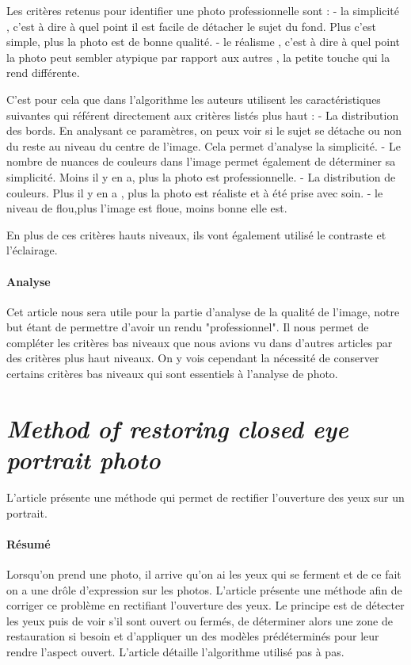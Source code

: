 \documentclass[11pt, french]{report-rd-info}
\begin{document}
Les critères retenus pour identifier une photo professionnelle sont :
- la simplicité , c'est à dire à quel point il est facile de détacher le sujet du fond. Plus c'est simple, plus la photo est de bonne qualité.
- le réalisme , c'est à dire à quel point la photo peut sembler atypique par rapport aux autres , la petite touche qui la rend différente.

C'est pour cela que dans l'algorithme les auteurs utilisent les caractéristiques suivantes qui référent directement aux critères listés plus haut : 
- La distribution des bords. En analysant ce paramètres, on peux voir si le sujet se détache ou non du reste au niveau du centre de l'image. Cela permet d'analyse la simplicité.
- Le nombre de nuances de couleurs dans l'image permet également de déterminer sa simplicité. Moins il y en a, plus la photo est professionnelle.
- La distribution de couleurs. Plus il y en a , plus la photo est réaliste et à été prise avec soin.
- le niveau de flou,plus l'image est floue, moins bonne elle est.

En plus de ces critères hauts niveaux, ils vont également utilisé le contraste et l'éclairage.


\paragraph{Analyse}
Cet article nous sera utile pour la partie d'analyse de la qualité de l'image, notre but étant de permettre d'avoir un rendu "professionnel". Il nous permet de compléter les critères bas niveaux que nous avions vu dans d'autres articles par des critères plus haut niveaux. On y vois cependant la nécessité de conserver certains critères bas niveaux qui sont essentiels à l'analyse de photo.

\section{\emph{Method of restoring closed eye portrait photo}}
L'article \cite{Li} présente une méthode qui permet de rectifier l'ouverture des yeux sur un portrait.

\paragraph{Résumé}
Lorsqu'on prend une photo, il arrive qu'on ai les yeux qui se ferment et de ce fait on a une drôle d'expression sur les photos. L'article présente une méthode afin de corriger ce problème en rectifiant l'ouverture des yeux.
Le principe est de détecter les yeux puis de voir s'il sont ouvert ou fermés, de déterminer alors une zone de restauration si besoin et d'appliquer un des modèles prédéterminés pour leur rendre l'aspect ouvert.
L'article détaille l'algorithme utilisé pas à pas.
\end{document}
